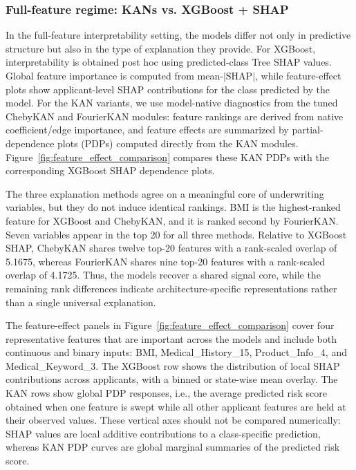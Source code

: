 \documentclass{article}
\begin{document}
\subsubsection{Full-feature regime: KANs vs. XGBoost + SHAP}
\label{sec:interpretability_dense}

In the full-feature interpretability setting, the models differ not only in predictive structure but also in the type of explanation they provide. For XGBoost, interpretability is obtained post hoc using predicted-class Tree SHAP values. Global feature importance is computed from mean-$|\mathrm{SHAP}|$, while feature-effect plots show applicant-level SHAP contributions for the class predicted by the model. For the KAN variants, we use model-native diagnostics from the tuned ChebyKAN and FourierKAN modules: feature rankings are derived from native coefficient/edge importance, and feature effects are summarized by partial-dependence plots (PDPs) computed directly from the KAN modules. Figure~\ref{fig:feature_effect_comparison} compares these KAN PDPs with the corresponding XGBoost SHAP dependence plots.

The three explanation methods agree on a meaningful core of underwriting variables, but they do not induce identical rankings. BMI is the highest-ranked feature for XGBoost and ChebyKAN, and it is ranked second by FourierKAN. Seven variables appear in the top 20 for all three methods. Relative to XGBoost SHAP, ChebyKAN shares twelve top-20 features with a rank-scaled overlap of 5.1675, whereas FourierKAN shares nine top-20 features with a rank-scaled overlap of 4.1725. Thus, the models recover a shared signal core, while the remaining rank differences indicate architecture-specific representations rather than a single universal explanation.

The feature-effect panels in Figure~\ref{fig:feature_effect_comparison} cover four representative features that are important across the models and include both continuous and binary inputs: BMI, Medical\_History\_15, Product\_Info\_4, and Medical\_Keyword\_3. The XGBoost row shows the distribution of local SHAP contributions across applicants, with a binned or state-wise mean overlay. The KAN rows show global PDP responses, i.e., the average predicted risk score obtained when one feature is swept while all other applicant features are held at their observed values. These vertical axes should not be compared numerically: SHAP values are local additive contributions to a class-specific prediction, whereas KAN PDP curves are global marginal summaries of the predicted risk score.
\end{document}
